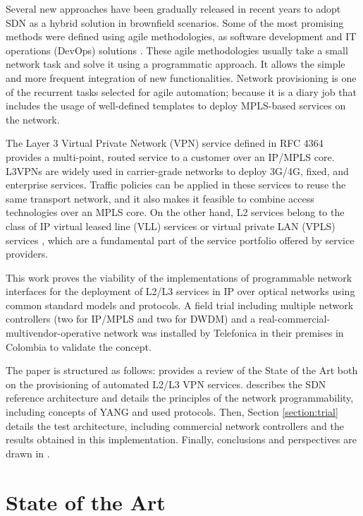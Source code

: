 \documentclass[10pt, conference]{IEEEtran}
\begin{document}
Several new approaches have been gradually released in recent years to adopt SDN as a hybrid solution in brownfield scenarios. Some of the most promising methods were defined using agile methodologies, as software development and IT operations (DevOps) solutions \cite{choi2018agile}. 
These agile methodologies usually take a small network task and solve it using a programmatic approach. It allows the simple and more frequent integration of new functionalities. Network provisioning is one of the recurrent tasks selected for agile automation; because it is a diary job that includes the usage of well-defined templates to deploy MPLS-based services on the network.

The Layer 3 Virtual Private Network (VPN) service defined in RFC 4364 \cite{rosen2006rfc} provides a multi-point, routed service to a customer over an IP/MPLS core. L3VPNs are widely used in carrier-grade networks to deploy 3G/4G, fixed, and enterprise services. Traffic policies can be applied in these services to reuse the same transport network, and it also makes it feasible to combine access technologies over an MPLS core. On the other hand, L2 services belong to the class of IP virtual leased line (VLL) services or virtual private LAN (VPLS) services \cite{andersson2006framework}, which are a fundamental part of the service portfolio offered by service providers. 

This work proves the viability of the implementations of programmable network interfaces for the deployment of L2/L3 services in IP over optical networks using common standard models and protocols. A field trial including multiple network controllers (two for IP/MPLS and two for DWDM) and a real-commercial-multivendor-operative network was installed by Telefonica in their premises in Colombia to validate the concept.

The paper is structured as follows:  provides a review of the State of the Art both on the provisioning of automated L2/L3 VPN services.  describes the SDN reference architecture and details the principles of the network programmability, including concepts of YANG and used protocols. Then, Section \ref{section:trial} details the test architecture, including commercial network controllers and the results obtained in this implementation. Finally, conclusions and perspectives are drawn in .    

\section{State of the Art}
\label{sec:soa}
\end{document}
